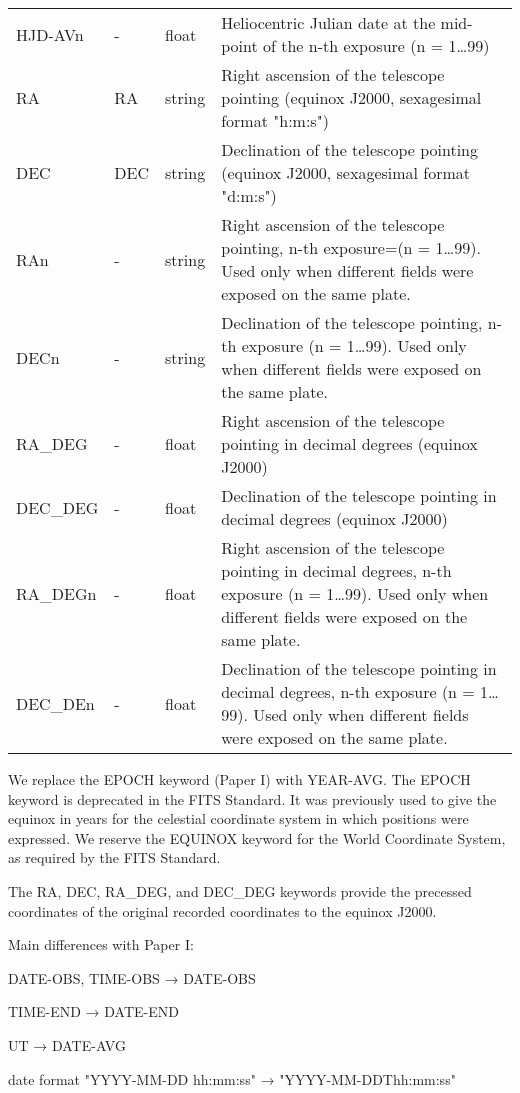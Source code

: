 \documentclass[11pt]{ivoa}
\begin{document}
\begin{longtable}{lllp{}}
HJD-AVn   &-         &float     &Heliocentric Julian date at the
mid-point of the n-th exposure (n = 1…99)\\
RA        &RA        &string    & Right ascension of the telescope
pointing (equinox J2000, sexagesimal format "h:m:s")\\
DEC       &DEC       &string    & Declination of the telescope pointing
(equinox J2000, sexagesimal format "d:m:s")\\
RAn       &-         &string    & Right ascension of the telescope
pointing, n-th exposure=(n = 1…99). Used only when different fields were
exposed on the same plate.\\
DECn      &-         &string    & Declination of the telescope pointing,
n-th exposure (n = 1…99). Used only when different fields were exposed
on the same plate.\\
RA\_DEG    &-         &float    & Right ascension of the telescope
pointing in decimal degrees (equinox J2000)\\
DEC\_DEG   &-         &float    & Declination of the telescope pointing in
decimal degrees (equinox J2000)\\
RA\_DEGn   &-         &float    & Right ascension of the telescope
pointing in decimal degrees, n-th exposure (n = 1…99). Used only when
different fields were exposed on the same plate.\\
DEC\_DEn   &-         &float    & Declination of the telescope pointing in
decimal degrees, n-th exposure (n = 1…99). Used only when different
fields were exposed on the same plate. \\
\end{longtable}
\endgroup


We replace the EPOCH keyword (Paper I) with YEAR-AVG. The EPOCH keyword
is deprecated in the FITS Standard. It was previously used to give the
equinox in years for the celestial coordinate system in which positions
were expressed. We reserve the EQUINOX keyword for the World Coordinate
System, as required by the FITS Standard.

The RA, DEC, RA\_DEG, and DEC\_DEG keywords provide the precessed
coordinates of the original recorded coordinates to the equinox J2000.

Main differences with Paper I:

DATE-OBS, TIME-OBS → DATE-OBS

TIME-END → DATE-END

UT → DATE-AVG

date format "YYYY-MM-DD hh:mm:ss" → "YYYY-MM-DDThh:mm:ss"
\end{document}
